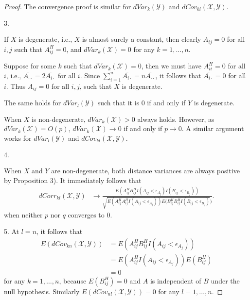 \documentclass[12pt]{article}
\begin{document}
\begin{proof}
The convergence proof is similar for $dVar_{k}(\mathcal{Y})$ and $dCov_{kl}(\mathcal{X},\mathcal{Y})$. 

3. 

If $X$ is degenerate, i.e., $X$ is almost surely a constant, then clearly $A_{ij}=0$ for all $i,j$ such that $A^{H}_{ij}=0$, and $dVar_{k}(\mathcal{X})=0$ for any $k=1,\ldots,n$.

Suppose for some $k$ such that $dVar_{k}(\mathcal{X})=0$, then we must have $A_{ii}^{H}=0$ for all $i$, i.e., $\bar{A_{\cdot \cdot}}=2\bar{A_{i\cdot}}$ for all $i$. Since $\sum_{i=1}^{n} \bar{A_{i\cdot}}=n\bar{A_{\cdot \cdot}}$, it follows that $\bar{A_{i\cdot}}=0$ for all $i$. Thus $A_{ij}=0$ for all $i,j$, such that $X$ is degenerate.

The same holds for $dVar_{l}(\mathcal{Y})$ such that it is $0$ if and only if $Y$ is degenerate.

When $X$ is non-degenerate, $dVar_{k}(\mathcal{X}) > 0$ always holds. However, as $dVar_{k}(\mathcal{X}) = O(p)$, $dVar_{k}(\mathcal{X}) \rightarrow 0$ if and only if $p \rightarrow 0$. A similar argument works for $dVar_{l}(\mathcal{Y})$ and $dCov_{kl}(\mathcal{X},\mathcal{Y})$.

4. 

When $X$ and $Y$ are non-degenerate, both distance variances are always positive by Proposition 3). It immediately follows that  
\begin{align*}
dCorr_{kl}(\mathcal{X},\mathcal{Y}) & \rightarrow \frac{E(A^{H}_{ij}B^{H}_{ij}I(A_{ij}< \epsilon_{A_{j}})I(B_{ij}< \epsilon_{B_{j}}))}{\sqrt{E(A^{H}_{ij}A^{H}_{ij}I(A_{ij}< \epsilon_{A_{j}}))E(B^{H}_{ij}B^{H}_{ij}I(B_{ij}< \epsilon_{B_{j}})})}. 
\end{align*}
when neither $p$ nor $q$ converges to $0$.

5. 
At $l=n$, it follows that
\begin{align*}
E(dCov_{kn}(\mathcal{X},\mathcal{Y})) &=E(A^{H}_{ij}B^{H}_{ij}I(A_{ij}< \epsilon_{A_{j}})) \\
&=E(A^{H}_{ij}I(A_{ij}< \epsilon_{A_{j}}))E(B^{H}_{ij}) \\
&=0 
\end{align*}
for any $k=1,\ldots,n$, because $E(B^{H}_{ij})=0$ and $A$ is independent of $B$ under the null hypothesis. Similarly $E(dCov_{nl}(\mathcal{X},\mathcal{Y}))=0$ for any $l=1,\ldots,n$.


\end{proof}
\end{document}
